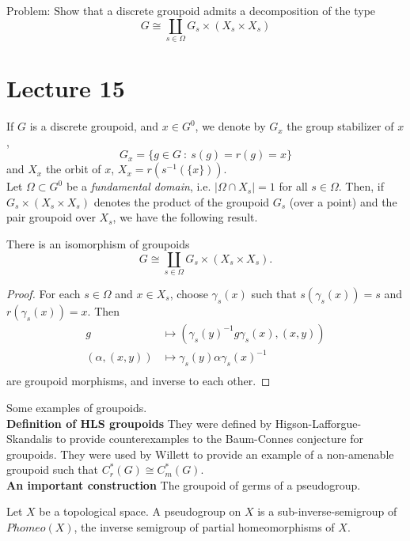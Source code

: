 Problem: Show that a discrete groupoid admits a decomposition of the type 
\[G \cong \coprod_{s\in \Omega} G_s \times (X_s \times X_s)\]

\section{Lecture 15}

If $G$ is a discrete groupoid, and $x\in G^0$, we denote by $G_x$ the group stabilizer of $x$, 
\[G_x = \{g\in G \ : \ s(g)=r(g)=x\}\]
and $X_x$ the orbit of $x$, $X_x = r(s^{-1}(\{x\}))$.\\

Let $\Omega \subset G^0$ be a \textit{fundamental domain}, i.e. $|\Omega \cap X_s| = 1$ for all $s\in \Omega$. Then, if $G_s \times (X_s\times X_s)$ denotes the product of the groupoid $G_s$ (over a point) and the pair groupoid over $X_s$, we have the following result.

\begin{prop}
There is an isomorphism of groupoids
\[G \cong \coprod_{s\in \Omega} G_s \times (X_s\times X_s).\]
\end{prop}
\begin{proof}
For each $s\in \Omega$ and $x\in X_s$, choose $\gamma_s(x)$ such that $s(\gamma_s(x))=s$ and $r(\gamma_s(x))=x$. Then 
\[\begin{split}
g & \mapsto (\gamma_s(y)^{-1}g\gamma_s(x), (x,y)) \\
(\alpha, (x,y)) & \mapsto \gamma_s(y)\alpha \gamma_s(x)^{-1} \\
\end{split}\]
are groupoid morphisms, and inverse to each other.
\end{proof}

Some examples of groupoids.\\

\textbf{Definition of HLS groupoids} They were defined by Higson-Lafforgue-Skandalis to provide counterexamples to the Baum-Connes conjecture for groupoids. They were used by Willett to provide an example of a non-amenable groupoid such that $C^*_r(G)\cong C^*_m(G)$. \\

\textbf{An important construction} The groupoid of germs of a pseudogroup.

\begin{definition}
Let $X$ be a topological space. A pseudogroup on $X$ is a sub-inverse-semigroup of $Phomeo(X)$, the inverse semigroup of partial homeomorphisms of $X$.
\end{definition}

